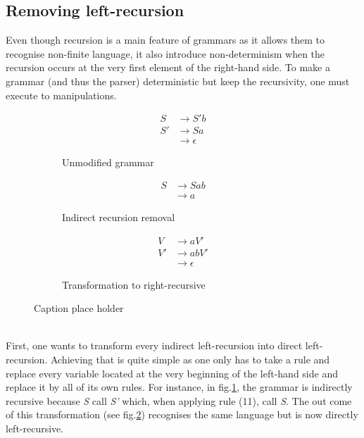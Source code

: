 \documentclass[a4paper,11pt]{article}
\begin{document}
  \subsection{Removing left-recursion}
    \label{sec:leftrecursion}
    Even though recursion is a main feature of grammars as it allows them to recognise non-finite language, it also introduce non-determinism when the recursion occurs at the very first element of the right-hand side. To make a grammar (and thus the parser) deterministic but keep the recursivity, one must execute to manipulations.
    \begin{figure}[h!]
      \centering
      \begin{subfigure}[b]{0.33\textwidth}
          \centering
          \begin{align}
            S  &\rightarrow S'b \\
            S' &\rightarrow Sa \\
               &\rightarrow \epsilon
          \end{align}
          \caption{Unmodified grammar}
          \label{fig:unmodifiedgrammar2}
      \end{subfigure}%
      \begin{subfigure}[b]{0.33\textwidth}
          \centering
          \begin{align}
            S  &\rightarrow Sab \\
               &\rightarrow a
          \end{align}
          \caption{Indirect recursion removal}
          \label{fig:indirectremovalgrammar2}
      \end{subfigure}
      \begin{subfigure}[b]{0.33\textwidth}
          \centering
          \begin{align}
            V  &\rightarrow aV' \\
            V' &\rightarrow abV' \\
               &\rightarrow \epsilon
          \end{align}
          \caption{Transformation to right-recursive}
          \label{fig:rightrecursivegrammar2}
      \end{subfigure}
      \caption{Caption place holder}
  \end{figure}\\
  First, one wants to transform every indirect left-recursion into direct left-recursion. Achieving that is quite simple as one only has to take a rule and replace every variable located at the very beginning of the left-hand side and replace it by all of its own rules. For instance, in fig.\ref{fig:unmodifiedgrammar2}, the grammar is indirectly recursive because \textit{S} call \textit{S'} which, when applying rule (11), call \textit{S}. The out come of this transformation (see fig.\ref{fig:indirectremovalgrammar2}) recognises the same language but is now directly left-recursive.\\
\end{document}
